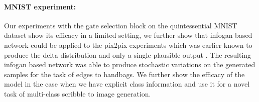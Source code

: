 \paragraph{MNIST experiment:}
Our experiments with the gate selection block on the quintessential MNIST dataset show its efficacy in a limited setting, we further show that infogan based network could be applied to the pix2pix experiments which was earlier known to produce the delta distribution and only a single plausible output \cite{ghosh2017multi}. The resulting infogan based network was able to produce stochastic variations on the generated samples for the task of edges to handbags. We further show the efficacy of the model in the case when we have explicit class information and use it for a novel task of multi-class scribble to image generation. 




